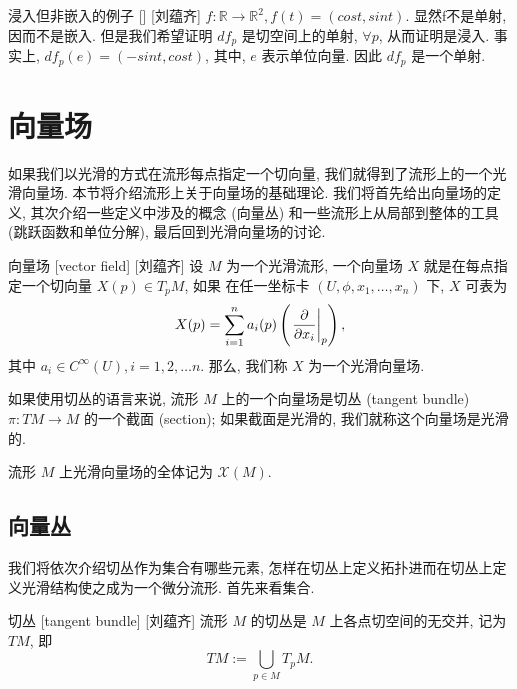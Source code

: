 \documentclass[UTF8]{ctexart}
\begin{document}
        \begin{xmp}
            []
            {浸入但非嵌入的例子}
            []
            [刘蕴齐]
             \(f: \mathbb{R} \to \mathbb{R}^2, f(t) = (cost, sint)\). 
            显然f不是单射, 因而不是嵌入. 
            但是我们希望证明  \(df_p\)  是切空间上的单射,  \(\forall p\), 从而证明是浸入. 
            事实上,  \(df_p(e) = (-sint, cost)\), 其中,  \(e\) 表示单位向量. 因此 \(df_p\) 是一个单射. 
        \end{xmp}

\section{向量场}
    
        如果我们以光滑的方式在流形每点指定一个切向量, 我们就得到了流形上的一个光滑向量场. 本节将介绍流形上关于向量场的基础理论. 我们将首先给出向量场的定义, 其次介绍一些定义中涉及的概念 (向量丛) 和一些流形上从局部到整体的工具 (跳跃函数和单位分解), 最后回到光滑向量场的讨论. 

        \begin{dfn}
            []
            {向量场}
            [vector field]
            [刘蕴齐]
            设 \(M\) 为一个光滑流形, 一个向量场 \(X\) 就是在每点指定一个切向量 \(X(p) \in T_p M\), 如果
            在任一坐标卡 \((U,\phi,x_1,\dots,x_n)\) 下,  \(X\)  可表为
            \[
            X(p)=\sum_{i=1}^{n} a_{i}(p)\left(\left. \frac{\partial}{\partial x_{i}} \right|_{p}^{}\right),
            \]
            其中 \(a_i \in C^{\infty}(U), i = 1,2, \dots n\). 那么, 我们称  \(X\)  为一个光滑向量场. 
            
            如果使用切丛的语言来说, 流形 \(M\) 上的一个向量场是切丛 (tangent bundle)  \(\pi: TM \to M\) 的一个截面 (section); 如果截面是光滑的, 我们就称这个向量场是光滑的. 
            
            流形  \(M\)  上光滑向量场的全体记为 \(\mathcal{X}(M)\).
        \end{dfn}
    
    \subsection{向量丛}
    
        我们将依次介绍切丛作为集合有哪些元素, 怎样在切丛上定义拓扑进而在切丛上定义光滑结构使之成为一个微分流形. 首先来看集合. 
        
        \begin{dfn}
            []
            {切丛}
            [tangent bundle]
            [刘蕴齐]
            流形 \(M\) 的切丛是 \(M\) 上各点切空间的无交并, 记为 \(TM\), 即
            \[
                TM:= \displaystyle\bigcup_{p \in M} T_p M.
            \]
        \end{dfn}
\end{document}
